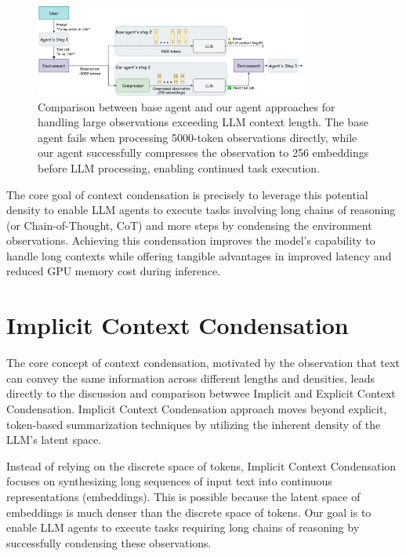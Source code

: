 \begin{figure}[hbt]
  \centering
  \includegraphics[width=0.8\textwidth]{graphs/example1.jpeg}
  \caption{Comparison between base agent and our agent approaches for handling large observations exceeding LLM context length. The base agent fails when processing 5000-token observations directly, while our agent successfully compresses the observation to 256 embeddings before LLM processing, enabling continued task execution.}
  \label{fig:example1}
\end{figure}

The core goal of context condensation is precisely to leverage this potential density to enable LLM agents to execute tasks involving long chains of reasoning (or Chain-of-Thought, CoT) and more steps by condensing the environment observations.
Achieving this condensation improves the model's capability to handle long contexts while offering tangible advantages in improved latency and reduced GPU memory cost during inference.




\section{Implicit Context Condensation}

The core concept of context condensation, motivated by the observation that text can convey the same information across different lengths and densities, leads directly to the discussion and comparison betwwee Implicit and Explicit Context Condensation.
Implicit Context Condensation approach moves beyond explicit, token-based summarization techniques by utilizing the inherent density of the LLM's latent space. 

Instead of relying on the discrete space of tokens, Implicit Context Condensation focuses on synthesizing long sequences of input text into continuous representations (embeddings). 
This is possible because the latent space of embeddings is much denser than the discrete space of tokens. 
Our goal is to enable LLM agents to execute tasks requiring long chains of reasoning by successfully condensing these observations.